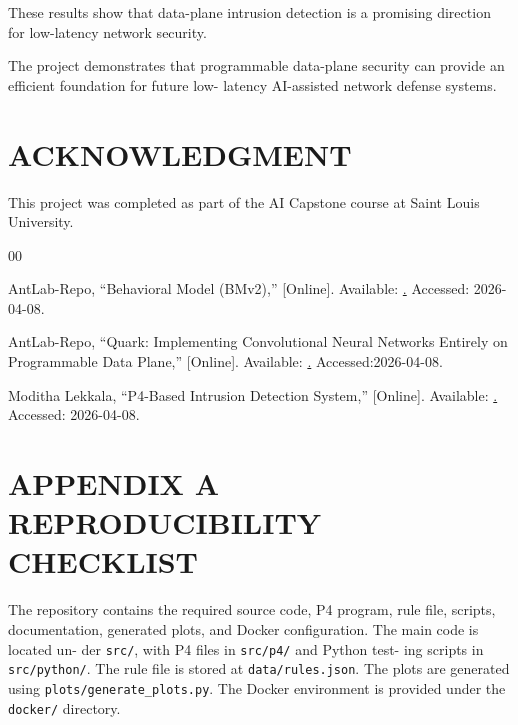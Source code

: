 \documentclass[conference]{IEEEtran}
\begin{document}
These results show that data-plane intrusion detection is
a promising direction for low-latency network security.

The project demonstrates that programmable data-plane
security can provide an efficient foundation for future low-
latency AI-assisted network defense systems.

\section*{ACKNOWLEDGMENT}

This project was completed as part of the AI Capstone
course at Saint Louis University.

\begin{thebibliography}{00}

AntLab-Repo,
``Behavioral Model (BMv2),''
[Online]. Available:
\href{https://github.com/p4lang/behavioral-model}. 
Accessed: 2026-04-08.

AntLab-Repo,
``Quark: Implementing Convolutional Neural Networks Entirely on Programmable Data Plane,''
[Online]. Available:
\href{https://github.com/AntLab-Repo/Quark-CNN-P4}. 
Accessed:2026-04-08.

Moditha Lekkala,
``P4-Based Intrusion Detection System,''
[Online]. Available:
\href{https://github.com/ModithaLekkala/-AI-Capstone-}. 
Accessed: 2026-04-08.

\end{thebibliography}

\clearpage

\appendices

\clearpage
\onecolumn

\section*{APPENDIX A\\REPRODUCIBILITY CHECKLIST}

The repository contains the required source code, P4
program, rule file, scripts, documentation, generated plots,
and Docker configuration. The main code is located un-
der \texttt{src/}, with P4 files in \texttt{src/p4/} and Python test-
ing scripts in \texttt{src/python/}. The rule file is stored
at \texttt{data/rules.json}. The plots are generated using
\texttt{plots/generate\_plots.py}. The Docker environment is
provided under the \texttt{docker/} directory.

\vspace{0.2cm}
\end{document}
